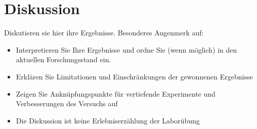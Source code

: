 \section*{Diskussion}
Diskutieren sie hier ihre Ergebnisse. Besonderes Augenmerk auf:
\begin{itemize}
    \item Interpretieren Sie Ihre Ergebnisse und ordne Sie (wenn möglich) in den aktuellen Forschungsstand ein.
	\item Erklären Sie Limitationen und Einschränkungen der gewonnenen Ergebnisse
	\item Zeigen Sie Anknüpfungspunkte für vertiefende Experimente und Verbesserungen des Versuchs auf
	\item Die Diskussion ist keine Erlebniserzählung der Laborübung
\end{itemize}